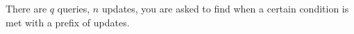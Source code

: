 
There are $q$ queries, $n$ updates, you are asked to find when a certain condition is met with a prefix of updates.\\